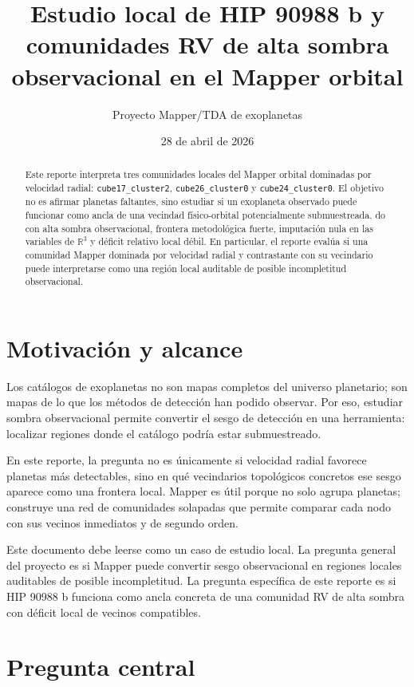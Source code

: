 \documentclass[11pt]{article}
\title{Estudio local de HIP 90988 b y comunidades RV de alta sombra observacional en el Mapper orbital}
\author{Proyecto Mapper/TDA de exoplanetas}
\date{28 de abril de 2026}
\begin{document}
\maketitle

\begin{abstract}
Este reporte interpreta tres comunidades locales del Mapper orbital dominadas por velocidad radial: \texttt{cube17\_cluster2}, \texttt{cube26\_cluster0} y \texttt{cube24\_cluster0}. El objetivo no es afirmar planetas faltantes, sino estudiar si un exoplaneta observado puede funcionar como ancla de una vecindad físico-orbital potencialmente submuestreada. do con alta sombra observacional, frontera metodológica fuerte, imputación nula en las variables de $\mathbb{R}^3$ y déficit relativo local débil. En particular, el reporte evalúa si una comunidad Mapper dominada por velocidad radial y contrastante con su vecindario puede interpretarse como una región local auditable de posible incompletitud observacional.
\end{abstract}

\section{Motivación y alcance}

Los catálogos de exoplanetas no son mapas completos del universo planetario; son mapas de lo que los métodos de detección han podido observar. Por eso, estudiar sombra observacional permite convertir el sesgo de detección en una herramienta: localizar regiones donde el catálogo podría estar submuestreado.

En este reporte, la pregunta no es únicamente si velocidad radial favorece planetas más detectables, sino en qué vecindarios topológicos concretos ese sesgo aparece como una frontera local. Mapper es útil porque no solo agrupa planetas; construye una red de comunidades solapadas que permite comparar cada nodo con sus vecinos inmediatos y de segundo orden.

Este documento debe leerse como un caso de estudio local. La pregunta general del proyecto es si Mapper puede convertir sesgo observacional en regiones locales auditables de posible incompletitud. La pregunta específica de este reporte es si HIP 90988 b funciona como ancla concreta de una comunidad RV de alta sombra con déficit local de vecinos compatibles.

\section{Pregunta central}
\end{document}
